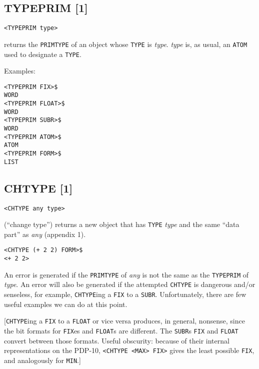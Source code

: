 \documentclass[a4paper]{scrbook}
\begin{document}
\subsection{TYPEPRIM {[}1{]}}\label{typeprim-1}

\begin{verbatim}
<TYPEPRIM type>
\end{verbatim}

 returns the \texttt{PRIMTYPE} of an object whose \texttt{TYPE} is \emph{type}. \emph{type}
is, as usual, an \texttt{ATOM} used to designate a \texttt{TYPE}.

Examples:

\begin{verbatim}
<TYPEPRIM FIX>$
WORD
<TYPEPRIM FLOAT>$
WORD
<TYPEPRIM SUBR>$
WORD
<TYPEPRIM ATOM>$
ATOM
<TYPEPRIM FORM>$
LIST
\end{verbatim}

\subsection{CHTYPE {[}1{]}}\label{chtype-1}

\begin{verbatim}
<CHTYPE any type>
\end{verbatim}

 (``change type'') returns a new object that has \texttt{TYPE} \emph{type} and the same
``data part'' as \emph{any} (appendix 1).

\begin{verbatim}
<CHTYPE (+ 2 2) FORM>$
<+ 2 2>
\end{verbatim}

An error is generated if the \texttt{PRIMTYPE} of \emph{any} is not the same as the \texttt{TYPEPRIM} of \emph{type}. An
error will also be generated if the attempted \texttt{CHTYPE} is dangerous and/or senseless, for example,
\texttt{CHTYPE}ing a \texttt{FIX} to a \texttt{SUBR}. Unfortunately, there are few useful examples we can do at this point.

{[}\texttt{CHTYPE}ing a \texttt{FIX} to a \texttt{FLOAT} or vice versa produces, in general, nonsense, since the bit
formats for \texttt{FIX}es and \texttt{FLOAT}s are different. The \texttt{SUBR}s \texttt{FIX} and \texttt{FLOAT} convert
between those formats. Useful obscurity: because of their internal representations on the PDP-10,
\texttt{\textless{}CHTYPE\ \textless{}MAX\textgreater{}\ FIX\textgreater{}} gives the least possible \texttt{FIX}, and
analogously for \texttt{MIN}.{]}
\end{document}
